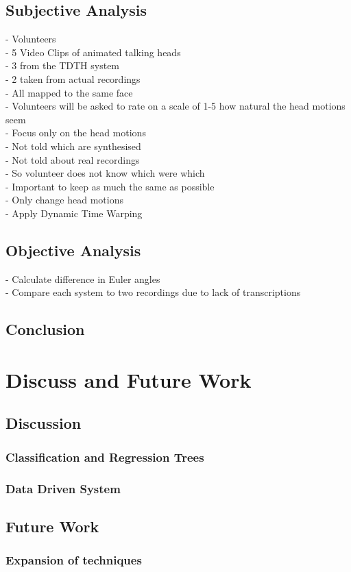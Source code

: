 \documentclass[bsc,frontabs,twoside,singlespacing,parskip]{infthesis}
\begin{document}
\section{Subjective Analysis}

- Volunteers\\
- 5 Video Clips of animated talking heads \\
- 3 from the TDTH system\\
- 2 taken from actual recordings \\
- All mapped to the same face \\

- Volunteers will be asked to rate on a scale of 1-5 how natural the head motions seem \\
- Focus only on the head motions \\
- Not told which are synthesised\\
- Not told about real recordings \\
- So volunteer does not know which were which\\

- Important to keep as much the same as possible\\
- Only change head motions\\
- Apply Dynamic Time Warping\\ 

\section{Objective Analysis}

- Calculate difference in Euler angles\\
- Compare each system to two recordings due to lack of transcriptions\\

\section{Conclusion}
\chapter{Discuss and Future Work}
\section{Discussion}
	\subsection{Classification and Regression Trees}
	\subsection{Data Driven System}
\section{Future Work}
	\subsection{Expansion of techniques}
	


\end{document}
